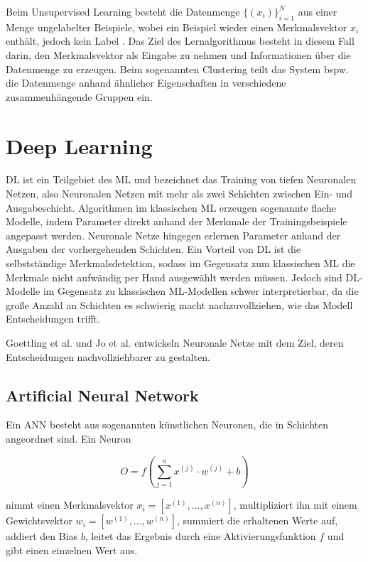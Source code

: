 Beim Unsupervised Learning besteht die Datenmenge $\{(x_i)\}^{N}_{i=1}$ aus einer Menge ungelabelter Beispiele, wobei ein Beispiel wieder einen Merkmalsvektor $x_i$ enthält, jedoch kein Label \cite{burkov_machine_2019}. Das Ziel des Lernalgorithmus besteht in diesem Fall darin, den Merkmalsvektor als Eingabe zu nehmen und Informationen über die Datenmenge zu erzeugen. Beim sogenannten Clustering teilt das System bspw. die Datenmenge anhand ähnlicher Eigenschaften in verschiedene zusammenhängende Gruppen ein. \cite{nguyen_machine_2018}


\section{Deep Learning}\label{sec:DL}

\gls{DL} ist ein Teilgebiet des \gls{ML} und bezeichnet das Training von tiefen Neuronalen Netzen, also Neuronalen Netzen mit mehr als zwei Schichten zwischen Ein- und Ausgabeschicht. Algorithmen im klassischen \gls{ML} erzeugen sogenannte flache Modelle, indem Parameter direkt anhand der Merkmale der Trainingsbeispiele angepasst werden. Neuronale Netze hingegen erlernen Parameter anhand der Ausgaben der vorhergehenden Schichten. Ein Vorteil von \gls{DL} ist die selbstständige Merkmalsdetektion, sodass im Gegensatz zum klassischen \gls{ML} die Merkmale nicht aufwändig per Hand ausgewählt werden müssen. Jedoch sind \gls{DL}-Modelle im Gegensatz zu klassischen \gls{ML}-Modellen schwer interpretierbar, da die große Anzahl an Schichten es schwierig macht nachzuvollziehen, wie das Modell Entscheidungen trifft.  \cite{burkov_machine_2019}

Goettling et al. \cite{goettling_xecgarch_2024} und Jo et al. \cite{jo_explainable_2021} entwickeln Neuronale Netze mit dem Ziel, deren Entscheidungen nachvollziehbarer zu gestalten.

\subsection{Artificial Neural Network}

Ein \gls{ANN} besteht aus sogenannten künstlichen Neuronen, die in Schichten angeordnet sind. Ein Neuron 

\begin{equation}
\label{Neuron}
O = f(\sum_{j=1}^n x^{(j)} \cdot w^{(j)}+b)
\end{equation}

nimmt einen Merkmalsvektor $x_i = [x^{(1)},..., x^{(n)}]$, multipliziert ihn mit einem Gewichtsvektor $w_i = [w^{(1)},..., w^{(n)}]$, summiert die erhaltenen Werte auf, addiert den Bias $b$, leitet das Ergebnis durch eine Aktivierungsfunktion $f$ und gibt einen einzelnen Wert aus. 

